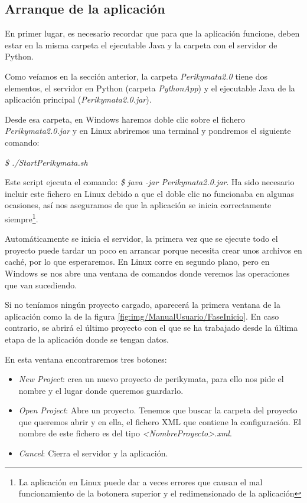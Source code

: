 \subsection{Arranque de la aplicación}
En primer lugar, es necesario recordar que para que la aplicación funcione, deben estar en la misma carpeta el ejecutable Java y la carpeta con el servidor de Python. 

Como veíamos en la sección anterior, la carpeta \textit{Perikymata2.0} tiene dos elementos, el servidor en Python (carpeta \textit{PythonApp}) y el ejecutable Java de la aplicación principal (\textit{Perikymata2.0.jar}).

Desde esa carpeta, en Windows haremos doble clic sobre el fichero \textit{Perikymata2.0.jar} y en Linux abriremos una terminal y pondremos el siguiente comando: \\ \centerline{\textit{\$ ./StartPerikymata.sh}}

Este script ejecuta el comando: \textit{\$ java -jar Perikymata2.0.jar}. Ha sido necesario incluir este fichero en Linux debido a que el doble clic no funcionaba en algunas ocasiones, así nos aseguramos de que la aplicación se inicia correctamente siempre\footnote{La aplicación en Linux puede dar a veces errores que causan el mal funcionamiento de la botonera superior y el redimensionado de la aplicación}.  

Automáticamente se inicia el servidor, la primera vez que se ejecute todo el proyecto puede tardar un poco en arrancar porque necesita crear unos archivos en caché, por lo que esperaremos. En Linux corre en segundo plano, pero en Windows se nos abre una ventana de comandos donde veremos las operaciones que van sucediendo. 

\newpage
Si no teníamos ningún proyecto cargado, aparecerá la primera ventana de la aplicación como la de la figura \ref{fig:img/ManualUsuario/FaseInicio}. En caso contrario, se abrirá el último proyecto con el que se ha trabajado desde la última etapa de la aplicación donde se tengan datos.


En esta ventana encontraremos tres botones:
\begin{itemize}
    \item \textit{New Project}: crea un nuevo proyecto de perikymata, para ello nos pide el nombre y el lugar donde queremos guardarlo.
    \item \textit{Open Project}: Abre un proyecto. Tenemos que buscar la carpeta del proyecto que queremos abrir y en ella, el fichero XML que contiene la configuración. El nombre de este fichero es del tipo \textit{<NombreProyecto>.xml}. 
    \item \textit{Cancel}: Cierra el servidor y la aplicación.
\end{itemize}

